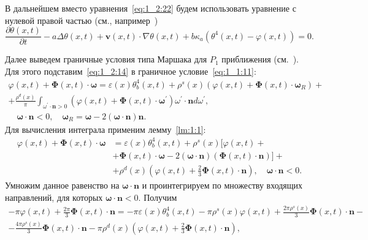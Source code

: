 В дальнейшем вместо уравнения~\eqref{eq:1_2:22} будем использовать уравнение
с нулевой правой частью (см., например~\cite{frank2010optimal})
\begin{equation}
    \label{eq:1_2:23}
    \frac{\partial \theta(x, t)}{\partial t}-a \Delta \theta(x, t)+\mathbf{v}(x, t) \cdot \nabla
    \theta(x, t)+b \kappa_{a}\left(\theta^{4}(x, t)-\varphi(x, t)\right)=0.
\end{equation}

Далее выведем граничные условия типа Маршака для $P_{1}$ приближения (см.\ \cite{Marshak1947}).
Для этого подставим~\eqref{eq:1_2:14} в граничное условие~\eqref{eq:1_1:11}:
\[
    \begin{gathered}
        \varphi(x, t)+\boldsymbol{\Phi}(x, t) \cdot \boldsymbol{\omega}=\varepsilon(x)
        \theta_{b}^{4}(x, t)+\rho^{s}(x)\left(\varphi(x, t)+\boldsymbol{\Phi}(x, t)
        \cdot \boldsymbol{\omega}_{R}\right)+ \\
        +\frac{\rho^{d}(x)}{\pi} \int_{\omega^{\prime} \cdot
        \mathbf{n}>0}\left(\varphi(x, t)+\boldsymbol{\Phi}(x, t) \cdot
        \boldsymbol{\omega}^{\prime}\right) \omega^{\prime} \cdot \mathbf{n} d \omega^{\prime}, \\
        \quad \boldsymbol{\omega} \cdot \mathbf{n}<0, \quad
        \boldsymbol{\omega}_{R}=\boldsymbol{\omega}-2(\boldsymbol{\omega} \cdot
        \mathbf{n}) \mathbf{n}.
    \end{gathered}
\]
Для вычисления интеграла применим лемму~\ref{lm:1:1}:
\[
    \begin{aligned}
        \varphi(x, t)+\boldsymbol{\Phi}(x, t) \cdot \boldsymbol{\omega} & =
        \varepsilon(x) \theta_{b}^{4}(x, t)+\rho^{s}(x)[\varphi(x, t) + \\
        &+\boldsymbol{\Phi}(x, t) \cdot \boldsymbol{\omega}-2(\boldsymbol{\omega}
        \cdot \mathbf{n})(\boldsymbol{\Phi}(x, t) \cdot \mathbf{n})]+\\
        &+\rho^{d}(x)\left(\varphi(x, t)+\frac{2}{3} \boldsymbol{\Phi}(x, t)
        \cdot \mathbf{n}\right), \quad \boldsymbol{\omega} \cdot \mathbf{n}<0.
    \end{aligned}
\]
Умножим данное равенство на $\boldsymbol{\omega} \cdot \mathbf{n}$ и проинтегрируем по множеству
входящих направлений, для которых $\boldsymbol{\omega} \cdot \mathbf{n}<0$.
Получим
\[
    \begin{gathered}
        -\pi \varphi(x, t)+\frac{2 \pi}{3} \boldsymbol{\Phi}(x, t) \cdot \mathbf{n}=
        -\pi \varepsilon(x) \theta_{b}^{4}(x, t)-\pi \rho^{s}(x) \varphi(x, t)+\frac{2 \pi \rho^{s}(x)}{3}
        \boldsymbol{\Phi}(x, t) \cdot \mathbf{n}- \\
        -\frac{4 \pi \rho^{s}(x)}{3} \boldsymbol{\Phi}(x, t) \cdot \mathbf{n}-\pi
        \rho^{d}(x)\left(\varphi(x, t)+\frac{2}{3} \boldsymbol{\Phi}(x, t) \cdot \mathbf{n}\right),
    \end{gathered}
\]
